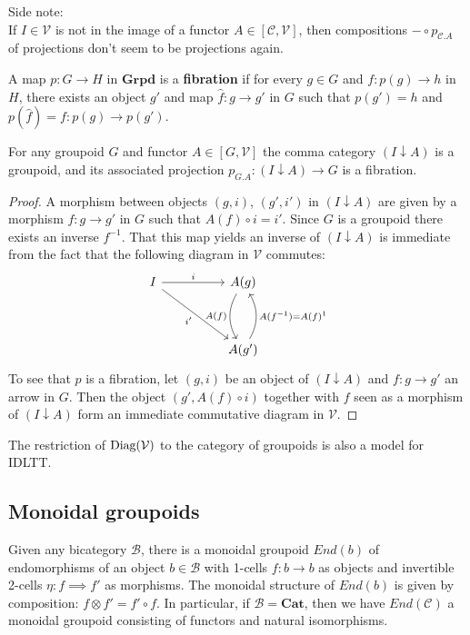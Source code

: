 Side note:\\
If $I \in \mathcal{V}$ is not in the image of a functor $A \in [\mathcal{C}, \mathcal{V}]$, then compositions $- \circ p_{\mathcal{C}.A}$ of projections don't seem to be projections again.
\begin{defn}
A map $p : G \to H$ in $\textbf{Grpd}$ is a \textbf{fibration} if for every $g \in G$ and $f : p(g) \to h$ in $H$, there exists an object $g'$ and map $\hat f : g \to g'$ in $G$ such that $p(g') = h$ and $p(\hat f) = f : p(g) \to p(g')$.
\end{defn}
\begin{lem}
For any groupoid $G$ and functor $A \in [G, \mathcal{V}]$ the comma category $(I \downarrow A)$ is a groupoid, and its associated projection $p_{G.A} : (I \downarrow A) \to G$ is a fibration.
\begin{proof}
A morphism between objects $(g, i)$, $(g', i')$ in $(I \downarrow A)$ are given by a morphism $f : g \to g'$ in $G$ such that $A(f) \circ i = i'$. Since $G$ is a groupoid there exists an inverse $f^{-1}$. That this map yields an inverse of $(I \downarrow A)$ is immediate from the fact that the following diagram in $\mathcal{V}$ commutes:
\[
\ti
I \ar[rd,"i'",swap] \ar[r, "i"] & A(g) \ar[d, "A(f)", bend right,swap] \\
& A(g') \ar[u, "A(f^{-1}) = A(f)^{1}", bend right,swap]
\kz
\]
To see that $p$ is a fibration, let $(g, i)$ be an object of $(I \downarrow A)$ and $f : g \to g'$ an arrow in $G$. Then the object $(g', A(f)\circ i)$ together with $f$ seen as a morphism of $(I \downarrow A)$ form an immediate commutative diagram in $\mathcal{V}$.
\end{proof}
\end{lem}
\begin{cor}
The restriction of $\operatorname{\text{Diag}}(\mathcal{V})$ to the category of groupoids is also a model for IDLTT.
\end{cor}



\subsection{Monoidal groupoids}
Given any bicategory $\mathcal{B}$, there is a monoidal groupoid $End(b)$ of endomorphisms of an object $b \in \mathcal{B}$ with 1-cells $f : b \to b$ as objects and invertible 2-cells $\eta : f \implies f'$ as morphisms. The monoidal structure of $End(b)$ is given by composition: $f \otimes f' = f'\circ f$. In particular, if $\mathcal{B} = \mathbf{Cat}$, then we have $End(\mathcal{C})$ a monoidal groupoid consisting of functors and natural isomorphisms.\\

